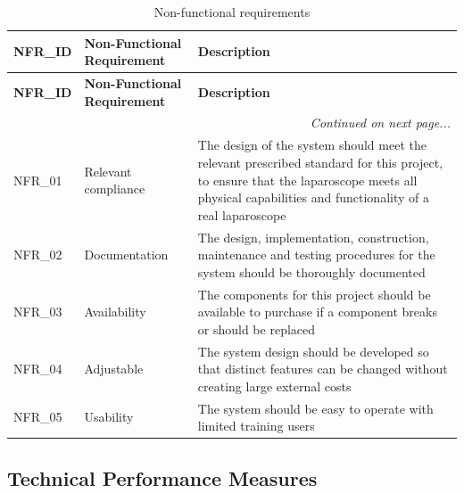 \begin{longtable}{|p{}|p{}|p{}|}

\caption{Non-functional requirements}
\label{tab:NFR} \\

\hline
\textbf{NFR\_ID} & 
\textbf{Non-Functional Requirement} & 
\textbf{Description}       \\                    
\hline
\endfirsthead

\hline
\textbf{NFR\_ID} & 
\textbf{Non-Functional Requirement} & 
\textbf{Description} \\                         %
\hline
\endhead

\hline
\multicolumn{3}{r|}{\textit{Continued on next page...}} \\
\hline
\endfoot

\endlastfoot

NFR\_01 & 
Relevant \mbox{compliance} & 
The design of the system should meet the relevant 
prescribed standard for this project, to ensure that 
the laparoscope meets all physical capabilities and 
functionality of a real laparoscope     \\                            
\hline

NFR\_02 & 
Documentation & 
The design, implementation, construction, maintenance 
and testing procedures for the system should be 
thoroughly documented       \\                           
\hline

NFR\_03 & 
Availability & 
The components for this project should be available 
to purchase if a component breaks or should be 
replaced \\
\hline

NFR\_04 & 
Adjustable & 
The system design should be developed so that distinct 
features can be changed without creating large 
external costs \\
\hline

NFR\_05 & 
Usability & 
The system should be easy to operate with limited training 
users \\
\hline

\end{longtable}


\subsection{Technical Performance Measures}


